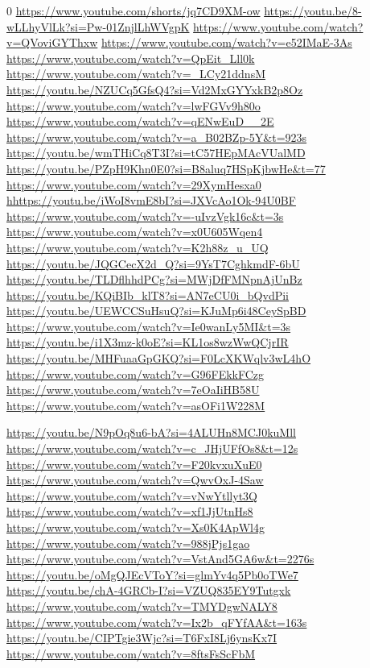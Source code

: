 \documentclass[a4paper,11pt]{book}
\begin{document}
\lstlistoflistings\begin{thebibliography}{0}
 \url{https://www.youtube.com/shorts/jq7CD9XM-ow}
 \url{https://youtu.be/8-wLLhyVlLk?si=Pw-01ZnjlLhWVgpK} 
 \url{https://www.youtube.com/watch?v=QVoviGYThxw}      
 \url{https://www.youtube.com/watch?v=e52IMaE-3As}
 \url{https://www.youtube.com/watch?v=QpEit_Lll0k}
 \url{https://www.youtube.com/watch?v=_LCy21ddnsM}
 \url{https://youtu.be/NZUCq5GfsQ4?si=Vd2MxGYYxkB2p8Oz}
 \url{https://www.youtube.com/watch?v=lwFGVv9h80o}
 \url{https://www.youtube.com/watch?v=qENwEuD__2E}
 \url{https://www.youtube.com/watch?v=a_B02BZp-5Y&t=923s}
 \url{https://youtu.be/wmTHiCq8T3I?si=tC57HEpMAcVUalMD}
 \url{https://youtu.be/PZpH9Khn0E0?si=B8aluq7HSpKjbwHe&t=77}
 \url{https://www.youtube.com/watch?v=29XymHesxa0}
 \url{hhttps://youtu.be/iWoI8vmE8bI?si=JXVcAo1Ok-94U0BF}
 \url{https://www.youtube.com/watch?v=-uIvzVgk16c&t=3s}
 \url{https://www.youtube.com/watch?v=x0U605Wqen4}
 \url{https://www.youtube.com/watch?v=K2h88z_u_UQ}
 \url{https://youtu.be/JQGCecX2d_Q?si=9YsT7CghkmdF-6bU}
 \url{https://youtu.be/TLDflhhdPCg?si=MWjDfFMNpnAjUnBz}
 \url{https://youtu.be/KQiBIb_klT8?si=AN7eCU0i_bQvdPii}
 \url{https://youtu.be/UEWCCSuHsuQ?si=KJuMp6i48CeySpBD}
 \url{https://www.youtube.com/watch?v=Ie0wanLy5MI&t=3s}
 \url{https://youtu.be/i1X3mz-k0oE?si=KL1os8wzWwQCjrIR}
 \url{https://youtu.be/MHFuaaGpGKQ?si=F0LcXKWqlv3wL4hO}
 \url{https://www.youtube.com/watch?v=G96FEkkFCzg}
 \url{https://www.youtube.com/watch?v=7eOaIiHB58U}
 \url{https://www.youtube.com/watch?v=asOFi1W228M}


 \url{https://youtu.be/N9pOq8u6-bA?si=4ALUHn8MCJ0kuMll}
 \url{https://www.youtube.com/watch?v=c_JHjUFfOs8&t=12s}
 \url{https://www.youtube.com/watch?v=F20kvxuXuE0}
 \url{https://www.youtube.com/watch?v=QwvOxJ-4Saw}
 \url{https://www.youtube.com/watch?v=vNwYtllyt3Q}
 \url{https://www.youtube.com/watch?v=xf1JjUtnHs8}
 \url{https://www.youtube.com/watch?v=Xs0K4ApWl4g}
 \url{https://www.youtube.com/watch?v=988jPjs1gao}
 \url{https://www.youtube.com/watch?v=VstAnd5GA6w&t=2276s}
 \url{https://youtu.be/oMgQJEcVToY?si=glmYv4q5Pb0oTWe7}
 \url{https://youtu.be/chA-4GRCb-I?si=VZUQ835EY9Tutgxk}
 \url{https://www.youtube.com/watch?v=TMYDgwNALY8}
 \url{https://www.youtube.com/watch?v=Ix2b_qFYfAA&t=163s}
 \url{https://youtu.be/CIPTgie3Wjc?si=T6FxI8Lj6ynsKx7I}
 \url{https://www.youtube.com/watch?v=8ftsFsScFbM}
\end{thebibliography}
\end{document}
